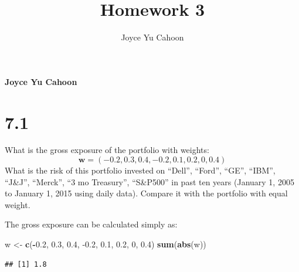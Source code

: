 \documentclass[11pt,]{article}
\title{Homework 3  }
\author{\Large Joyce Yu Cahoon\vspace{0.05in} \newline\normalsize\emph{}  }
\date{}
\newcommand*{\authorfont}{\fontfamily{phv}\selectfont}
\newenvironment{Shaded}{\begin{snugshade}}{\end{snugshade}}
\newcommand{\DecValTok}[1]{\textcolor[rgb]{0.00,0.00,0.81}{#1}}
\newcommand{\FloatTok}[1]{\textcolor[rgb]{0.00,0.00,0.81}{#1}}
\newcommand{\KeywordTok}[1]{\textcolor[rgb]{0.13,0.29,0.53}{\textbf{#1}}}
\newcommand{\NormalTok}[1]{#1}
\newcommand{\OperatorTok}[1]{\textcolor[rgb]{0.81,0.36,0.00}{\textbf{#1}}}
\newcommand{\StringTok}[1]{\textcolor[rgb]{0.31,0.60,0.02}{#1}}
\renewenvironment{quote}{\begin{shaded*}}{\end{shaded*}}
\begin{document}
%

{%
\setlength{\parindent}{0pt}
\thispagestyle{plain}
{\fontsize{18}{20}\selectfont\raggedright 
\maketitle  %

}

{
  \vskip 13.5pt\relax \normalsize\fontsize{11}{12} 
  \textbf{\authorfont Joyce Yu Cahoon} \hskip 15pt \emph{\small }   
  
}

}






\vskip 6.5pt


\noindent  \hypertarget{section}{%
\section{7.1}\label{section}}

What is the gross exposure of the portfolio with weights: \[
{\bm{{w}}} = (-0.2, 0.3, 0.4, -0.2, 0.1, 0.2, 0, 0.4)
\] What is the risk of this portfolio invested on ``Dell'', ``Ford'',
``GE'', ``IBM'', ``J\&J'', ``Merck'', ``3 mo Treasury'', ``S\&P500'' in
past ten years (January 1, 2005 to January 1, 2015 using daily data).
Compare it with the portfolio with equal weight.

\begin{quote}
The gross exposure can be calculated simply as:
\end{quote}

\begin{Shaded}
\begin{Highlighting}[]
\NormalTok{w <-}\StringTok{ }\KeywordTok{c}\NormalTok{(}\OperatorTok{-}\FloatTok{0.2}\NormalTok{, }\FloatTok{0.3}\NormalTok{, }\FloatTok{0.4}\NormalTok{, }\FloatTok{-0.2}\NormalTok{, }\FloatTok{0.1}\NormalTok{, }\FloatTok{0.2}\NormalTok{, }\DecValTok{0}\NormalTok{, }\FloatTok{0.4}\NormalTok{)}
\KeywordTok{sum}\NormalTok{(}\KeywordTok{abs}\NormalTok{(w))}
\end{Highlighting}
\end{Shaded}

\begin{verbatim}
## [1] 1.8
\end{verbatim}
\end{document}
